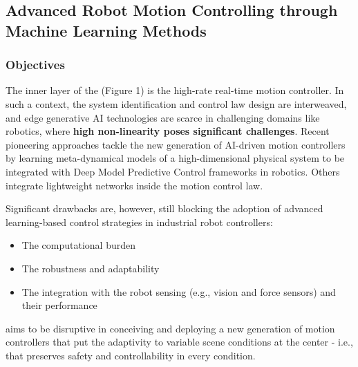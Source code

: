 \subsection{\texorpdfstring{Advanced Robot Motion Controlling through
Machine Learning Methods
}{Advanced Robot Motion Controlling through Machine Learning Methods }}\label{advanced-robot-motion-controlling-through-machine-learning-methods}

\subsubsection{\texorpdfstring{Objectives
}{Objectives }}\label{objectives-2}

The inner layer of the  (Figure 1) is the high-rate
real-time motion controller. In such a context, the system
identification and control law design are interweaved, and edge
generative AI technologies are scarce in challenging domains like
robotics, where \textbf{high non-linearity poses significant
challenges}. Recent pioneering approaches tackle the new generation of
AI-driven motion controllers by learning meta-dynamical models of a
high-dimensional physical system to be integrated with Deep Model
Predictive Control frameworks in robotics. Others integrate lightweight
networks inside the motion control law.

Significant drawbacks are, however, still blocking the adoption of
advanced learning-based control strategies in industrial robot
controllers:

\begin{itemize}
\item
  The computational burden
\item
  The robustness and adaptability
\item
  The integration with the robot sensing (e.g., vision and force
  sensors) and their performance
\end{itemize}

 aims to be disruptive in conceiving and deploying a
new generation of motion controllers that put the adaptivity to variable
scene conditions at the center - i.e., that preserves safety and
controllability in every condition.

